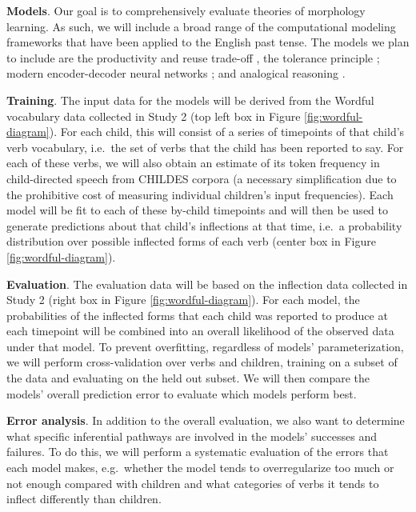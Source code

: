 \documentclass[
   11pt,
       ]{book}
\begin{document}
\textbf{Models}. Our goal is to comprehensively evaluate theories of morphology learning. As such, we will include a broad range of the computational modeling frameworks that have been applied to the English past tense. The models we plan to include are the productivity and reuse trade-off \citep{odonnell2011, odonnell2015, odonnell2009, odonnell2011}, the tolerance principle \citep{yang2005, yang2010, yang2016, yang2017}; modern encoder-decoder neural networks \citep{cotterell2016, kirov2018}; and analogical reasoning \citep{daelemans2005, skousen1989}.

\textbf{Training}. The input data for the models will be derived from the Wordful vocabulary data collected in Study 2 (top left box in Figure \ref{fig:wordful-diagram}). For each child, this will consist of a series of timepoints of that child's verb vocabulary, i.e.~the set of verbs that the child has been reported to say. For each of these verbs, we will also obtain an estimate of its token frequency in child-directed speech from CHILDES corpora (a necessary simplification due to the prohibitive cost of measuring individual children's input frequencies). Each model will be fit to each of these by-child timepoints and will then be used to generate predictions about that child's inflections at that time, i.e.~a probability distribution over possible inflected forms of each verb (center box in Figure \ref{fig:wordful-diagram}).

\textbf{Evaluation}. The evaluation data will be based on the inflection data collected in Study 2 (right box in Figure \ref{fig:wordful-diagram}). For each model, the probabilities of the inflected forms that each child was reported to produce at each timepoint will be combined into an overall likelihood of the observed data under that model. To prevent overfitting, regardless of models' parameterization, we will perform cross-validation over verbs and children, training on a subset of the data and evaluating on the held out subset. We will then compare the models' overall prediction error to evaluate which models perform best.

\textbf{Error analysis}. In addition to the overall evaluation, we also want to determine what specific inferential pathways are involved in the models' successes and failures. To do this, we will perform a systematic evaluation of the errors that each model makes, e.g.~whether the model tends to overregularize too much or not enough compared with children and what categories of verbs it tends to inflect differently than children.
\end{document}
